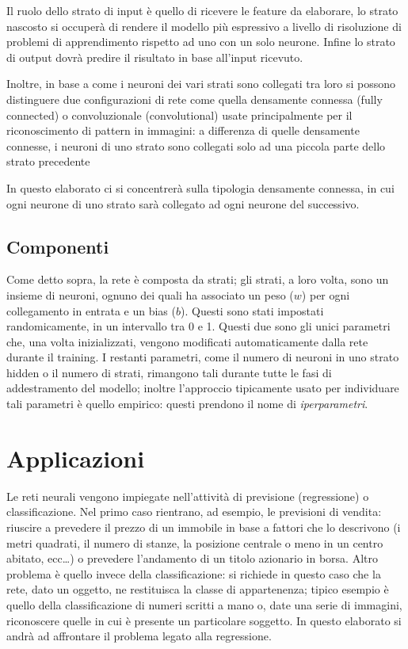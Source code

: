 \documentclass[12pt]{report}
\begin{document}
Il ruolo dello strato di input è quello di ricevere le feature da elaborare, lo strato nascosto si occuperà di rendere il modello più espressivo a livello di risoluzione di problemi di apprendimento rispetto ad uno con un solo neurone. Infine lo strato di output dovrà predire il risultato in base all’input ricevuto.

Inoltre, in base a come i neuroni dei vari strati sono collegati tra loro si possono distinguere due configurazioni di rete come quella densamente connessa (fully connected) o convoluzionale (convolutional) usate principalmente per il riconoscimento di pattern in immagini: a differenza di quelle densamente connesse, i neuroni di uno strato sono collegati solo ad una piccola parte dello strato precedente ~\cite{Convolutional}

In questo elaborato ci si concentrerà sulla tipologia densamente connessa, in cui ogni neurone di uno strato sarà collegato ad ogni neurone del successivo.

\subsection{Componenti}
Come detto sopra, la rete è composta da strati; gli strati, a loro volta, sono un insieme di neuroni, ognuno dei quali ha associato un peso ($w$) per ogni collegamento in entrata e un bias ($b$). Questi sono stati impostati randomicamente, in un intervallo tra 0 e 1. Questi due sono gli unici parametri che, una volta inizializzati, vengono modificati automaticamente dalla rete durante il training. I restanti parametri, come il numero di neuroni in uno strato hidden o il numero di strati, rimangono tali durante tutte le fasi di addestramento del modello; inoltre l'approccio tipicamente usato per individuare tali parametri è quello empirico: questi prendono il nome di \textit{iperparametri}.


\section{Applicazioni}
Le reti neurali vengono impiegate nell’attività di previsione (regressione) o classificazione.
Nel primo caso rientrano, ad esempio, le previsioni di vendita: riuscire a prevedere il prezzo di un immobile in base a fattori che lo descrivono (i metri quadrati, il numero di stanze, la posizione centrale o meno in un centro abitato, ecc…) o prevedere l’andamento di un titolo azionario in borsa.
Altro problema è quello invece della classificazione: si richiede in questo caso che la rete, dato un oggetto, ne restituisca la classe di appartenenza; tipico esempio è quello della classificazione di numeri scritti a mano o, date una serie di immagini, riconoscere quelle in cui è presente un particolare soggetto.
In questo elaborato si andrà ad affrontare il problema legato alla regressione.
\end{document}
